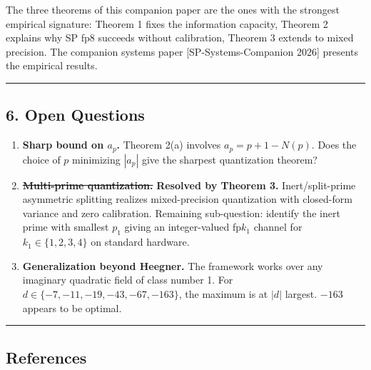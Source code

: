 \documentclass[
  11pt,
]{article}
\begin{document}
The three theorems of this companion paper are the ones with the
strongest empirical signature: Theorem 1 fixes the information capacity,
Theorem 2 explains why SP fp8 succeeds without calibration, Theorem 3
extends to mixed precision. The companion systems paper
{[}SP-Systems-Companion 2026{]} presents the empirical results.

\begin{center}\rule{0.5\linewidth}{0.5pt}\end{center}

\hypertarget{open-questions}{%
\subsection{6. Open Questions}\label{open-questions}}

\begin{enumerate}
\def\labelenumi{\arabic{enumi}.}
\item
  \textbf{Sharp bound on \(a_p\).} Theorem 2(a) involves
  \(a_p = p + 1 - N(p)\). Does the choice of \(p\) minimizing \(|a_p|\)
  give the sharpest quantization theorem?
\item
  \sout{\textbf{Multi-prime quantization.}} \textbf{Resolved by Theorem
  3.} Inert/split-prime asymmetric splitting realizes mixed-precision
  quantization with closed-form variance and zero calibration. Remaining
  sub-question: identify the inert prime with smallest \(p_1\) giving an
  integer-valued fp\(k_1\) channel for \(k_1 \in \{1, 2, 3, 4\}\) on
  standard hardware.
\item
  \textbf{Generalization beyond Heegner.} The framework works over any
  imaginary quadratic field of class number 1. For
  \(d \in \{-7, -11, -19, -43, -67, -163\}\), the maximum is at \(|d|\)
  largest. \(-163\) appears to be optimal.
\end{enumerate}

\begin{center}\rule{0.5\linewidth}{0.5pt}\end{center}

\hypertarget{references}{%
\subsection{References}\label{references}}
\end{document}
